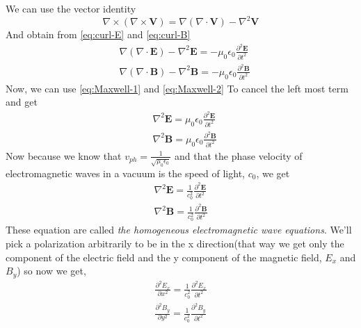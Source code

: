 \documentclass[english, a4paper, 12pt, twoside]{article}
\numberwithin{equation}{section} %
\begin{document}
We can use the vector identity
\begin{equation}
    \nabla \times \left( \nabla \times \mathbf{V} \right) = \nabla \left( \nabla \cdot \mathbf{V} \right) - \nabla^2 \mathbf{V}
\end{equation}
And obtain from \ref{eq:curl-E} and \ref{eq:curl-B}
\begin{subequations}
    \begin{align}
        &\nabla(\nabla \cdot \textbf{E}) - \nabla^2 \textbf{E} 
        = -\mu_0\epsilon_0\frac{\partial^2 \textbf{E}}{\partial t^2} \\
        &\nabla(\nabla \cdot \textbf{B}) - \nabla^2 \textbf{B} 
        = -\mu_0\epsilon_0\frac{\partial^2 \textbf{B}}{\partial t^2}
    \end{align}
\end{subequations}
Now, we can use \ref{eq:Maxwell-1} and \ref{eq:Maxwell-2} To cancel the left most term and get
\begin{subequations}
    \begin{align}
        &\nabla^2 \textbf{E} = \mu_0\epsilon_0\frac{\partial^2 \textbf{E}}{\partial t^2}\\
        &\nabla^2 \textbf{B} = \mu_0\epsilon_0\frac{\partial^2 \textbf{B}}{\partial t^2}
    \end{align}
\end{subequations}
Now because we know that $v_{ph} = \frac{1}{\sqrt{\mu_0\epsilon_0}}$ and that the phase velocity of electromagnetic waves in a vacuum is the speed of light, $c_0$, we get
\begin{equation} \label{eq:Homo_electro_wave}
    \begin{split}
        \nabla^2 \textbf{E} = \frac{1}{c_0^2}\frac{\partial^2 \textbf{E}}{\partial t^2} \\
        \nabla^2 \textbf{B} = \frac{1}{c_0^2}\frac{\partial^2 \textbf{B}}{\partial t^2}
    \end{split}
\end{equation}
These equation are called \textit{the homogeneous electromagnetic wave equations}.
We'll pick a polarization arbitrarily to be in the x direction(that way we get only the component of the electric field and the y component of the magnetic field, $E_x$ and $B_y$) so now we get,
\begin{equation} \label{eq:Homo_electro_wave_pol}
    \begin{split}
        \frac{\partial^2 E_x}{\partial x^2} = \frac{1}{c_0^2}\frac{\partial^2 E_x}{\partial t^2} \\
        \frac{\partial^2 B_y}{\partial y^2} = \frac{1}{c_0^2}\frac{\partial^2 B_y}{\partial t^2} 
    \end{split}
\end{equation}
\end{document}

